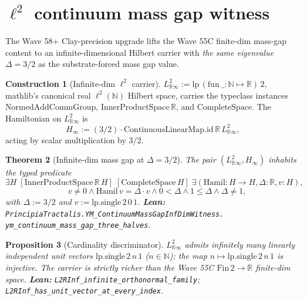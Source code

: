 \documentclass[11pt,a4paper]{article}
\theoremstyle{plain}
\newtheorem{theorem}{Theorem}[section]
\newtheorem{proposition}[theorem]{Proposition}
\theoremstyle{definition}
\newtheorem{construction}[theorem]{Construction}
\begin{document}
\section{$\ell^{2}$ continuum mass gap witness}
\label{sec:linfdim}

The Wave 58+ Clay-precision upgrade lifts the Wave 55C finite-dim
mass-gap content to an infinite-dimensional Hilbert carrier with
\emph{the same eigenvalue} $\Delta = 3/2$ as the substrate-forced
mass gap value.

\begin{construction}[Infinite-dim $\ell^{2}$ carrier]
\label{cons:l2carrier}
$L^{2}_{\mathbb{R}\infty} := \mathrm{lp}\,(\mathrm{fun}\;\_:\mathbb{N}
\mapsto \mathbb{R})\,2$, mathlib's canonical real
$\ell^{2}(\mathbb{N})$ Hilbert space, carries the typeclass
instances $\mathrm{NormedAddCommGroup}$,
$\mathrm{InnerProductSpace}\,\mathbb{R}$, and
$\mathrm{CompleteSpace}$. The Hamiltonian on $L^{2}_{\mathbb{R}\infty}$
is
\[
H_{\infty} := (3/2) \cdot \mathrm{ContinuousLinearMap.id}\,
\mathbb{R}\,L^{2}_{\mathbb{R}\infty},
\]
acting by scalar multiplication by $3/2$.
\end{construction}

\begin{theorem}[Infinite-dim mass gap at $\Delta = 3/2$]
\label{thm:linfgap}
The pair $(L^{2}_{\mathbb{R}\infty}, H_{\infty})$ inhabits the
typed predicate
\[
\exists H \;[\mathrm{InnerProductSpace}\,\mathbb{R}\,H]\;
[\mathrm{CompleteSpace}\,H]\;\exists (\mathrm{Hamil}: H \to H,
\Delta: \mathbb{R}, v: H),
\]
\[
\quad v \ne 0 \wedge \mathrm{Hamil}\,v = \Delta \cdot v \wedge
0 < \Delta \wedge 1 \le \Delta \wedge \Delta \ne 1,
\]
with $\Delta := 3/2$ and $v := \mathrm{lp.single}\,2\,0\,1$.
\textbf{Lean:}
\texttt{PrincipiaTractalis.YM\_ContinuumMassGapInfDimWitness.\\
ym\_continuum\_mass\_gap\_three\_halves}.
\end{theorem}

\begin{proposition}[Cardinality discriminator]
\label{prop:discriminator}
$L^{2}_{\mathbb{R}\infty}$ admits infinitely many linearly
independent unit vectors $\mathrm{lp.single}\,2\,n\,1$
($n \in \mathbb{N}$); the map $n \mapsto \mathrm{lp.single}\,2\,n\,1$
is injective. The carrier is strictly richer than the Wave 55C
$\mathrm{Fin}\,2 \to \mathbb{R}$ finite-dim space.
\textbf{Lean:}
\texttt{L2RInf\_infinite\_orthonormal\_family};
\texttt{L2RInf\_has\_unit\_vector\_at\_every\_index}.
\end{proposition}
\end{document}
